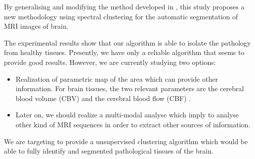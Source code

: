 By generalising and modifying the method developed in \cite{tartare2014contribution}, this study proposes a new methodology using spectral clustering for the automatic segmentation of MRI images of brain.

The experimental results show that our algorithm is able to isolate the pathology from healthy tissues. Presently, we have only a reliable algorithm that seems to provide good results. However, we are currently studying two options:

\begin{itemize}
\item Realization of parametric map of the area which can provide other information. For brain tissues, the two relevant parameters are the cerebral blood volume (CBV) and the cerebral blood flow (CBF)  \cite{muir2014quantitative}.
\item Later on, we should realize a multi-modal analyse which imply to analyse other kind of MRI sequences in order to extract other sources of information.

\end{itemize}

We are targeting to provide a unsupervised clustering algorithm which would be able to fully identify and segmented pathological tissues of the brain.


 